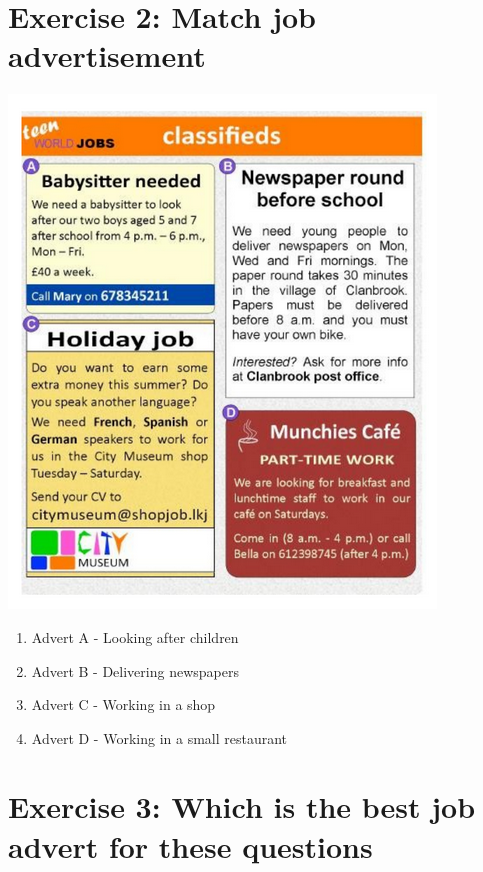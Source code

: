\documentclass[12pt,titlepage]{article}
\begin{document}
\section{Exercise 2: Match job advertisement}

\begin{center}
    \includegraphics*[width=.8\textwidth]{./images/classifieds.png}
\end{center}

\begin{enumerate}
    \item Advert A - Looking after children
    \item Advert B - Delivering newspapers
    \item Advert C - Working in a shop
    \item Advert D - Working in a small restaurant
\end{enumerate}

\section{Exercise 3: Which is the best job advert for these questions}
\end{document}

